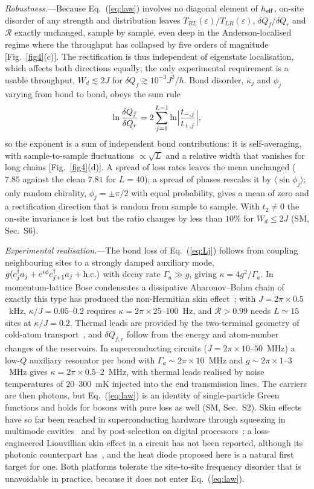 \documentclass[reprint,aps,prl,superscriptaddress,nofootinbib,floatfix]{revtex4-2}
\newcommand{\R}{\mathcal{R}}
\newcommand{\dQ}{\delta Q}
\newcommand{\heff}{h_{\rm eff}}
\begin{document}
\textit{Robustness.}---Because Eq.~(\ref{eq:law}) involves no diagonal element of $\heff$, on-site disorder of any strength and distribution leaves $T_{RL}(\varepsilon)/T_{LR}(\varepsilon)$, $\dQ_f/\dQ_r$ and $\R$ exactly unchanged, sample by sample, even deep in the Anderson-localised regime where the throughput has collapsed by five orders of magnitude [Fig.~\ref{fig4}(c)]. The rectification is thus independent of eigenstate localisation, which affects both directions equally; the only experimental requirement is a usable throughput, $W_d\lesssim2J$ for $\dQ_f\gtrsim10^{-3}J^2/\hbar$. Bond disorder, $\kappa_j$ and $\phi_j$ varying from bond to bond, obeys the sum rule
\begin{equation}
\ln\frac{\dQ_f}{\dQ_r}=2\sum_{j=1}^{L-1}\ln\Bigl|\frac{t_{-,j}}{t_{+,j}}\Bigr|,
\label{eq:sumrule}
\end{equation}
so the exponent is a sum of independent bond contributions: it is self-averaging, with sample-to-sample fluctuations $\propto\sqrt{L}$ and a relative width that vanishes for long chains [Fig.~\ref{fig4}(d)]. A spread of loss rates leaves the mean unchanged ($7.85$ against the clean $7.81$ for $L=40$); a spread of phases rescales it by $\langle\sin\phi_j\rangle$; only random chirality, $\phi_j=\pm\pi/2$ with equal probability, gives a mean of zero and a rectification direction that is random from sample to sample. With $t_2\neq0$ the on-site invariance is lost but the ratio changes by less than $10\%$ for $W_d\le2J$ (SM, Sec.~S6).

\textit{Experimental realisation.}---The bond loss of Eq.~(\ref{eq:Lj}) follows from coupling neighbouring sites to a strongly damped auxiliary mode, $g(c_j^\dagger a_j+e^{i\phi}c_{j+1}^\dagger a_j+{\rm h.c.})$ with decay rate $\Gamma_a\gg g$, giving $\kappa=4g^2/\Gamma_a$. In momentum-lattice Bose condensates a dissipative Aharonov--Bohm chain of exactly this type has produced the non-Hermitian skin effect~\cite{Liang2022}; with $J=2\pi\times0.5$~kHz, $\kappa/J=0.05$--$0.2$ requires $\kappa=2\pi\times25$--$100$~Hz, and $\R>0.99$ needs $L\simeq15$ sites at $\kappa/J=0.2$. Thermal leads are provided by the two-terminal geometry of cold-atom transport~\cite{Brantut2012,Krinner2017}, and $\dQ_{f,r}$ follow from the energy and atom-number changes of the reservoirs. In superconducting circuits ($J=2\pi\times10$--$50$~MHz) a low-$Q$ auxiliary resonator per bond with $\Gamma_a\sim2\pi\times10$~MHz and $g\sim2\pi\times1$--$3$~MHz gives $\kappa=2\pi\times0.5$--$2$~MHz, with thermal leads realised by noise temperatures of $20$--$300$~mK injected into the end transmission lines. The carriers are then photons, but Eq.~(\ref{eq:law}) is an identity of single-particle Green functions and holds for bosons with pure loss as well (SM, Sec.~S2). Skin effects have so far been reached in superconducting hardware through squeezing in multimode cavities~\cite{Busnaina2024} and by post-selection on digital processors~\cite{Shen2025}; a loss-engineered Liouvillian skin effect in a circuit has not been reported, although its photonic counterpart has~\cite{Yang2026}, and the heat diode proposed here is a natural first target for one. Both platforms tolerate the site-to-site frequency disorder that is unavoidable in practice, because it does not enter Eq.~(\ref{eq:law}).
\end{document}
